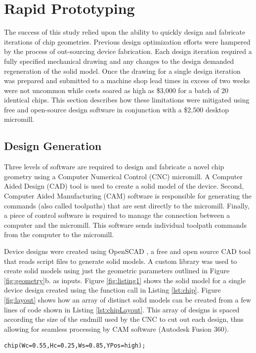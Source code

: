 \section{Rapid Prototyping}
\label{sec:rp}
The success of this study relied upon the ability to quickly design and fabricate iterations of chip geometries. Previous design optimization efforts were hampered by the process of out-sourcing device fabrication. Each design iteration required a fully specified mechanical drawing and any changes to the design demanded regeneration of the solid model. Once the drawing for a single design iteration was prepared and submitted to a machine shop lead times in excess of two weeks were not uncommon while costs soared as high as \$3,000 for a batch of 20 identical chips. This section describes how these limitations were mitigated using free and open-source design software in conjunction with a \$2,500 desktop micromill.

\subsection{Design Generation}
\label{ssec:design}
Three levels of software are required to design and fabricate a novel chip geometry using a Computer Numerical Control (CNC) micromill. A Computer Aided Design (CAD) tool is used to create a solid model of the device. Second, Computer Aided Manufacturing (CAM) software is responsible for generating the commands (also called toolpaths) that are sent directly to the micromill. Finally, a piece of control software is required to manage the connection between a computer and the micromill. This software sends individual toolpath commands from the computer to the micromill. 

Device designs were created using OpenSCAD \cite{wikiOpenScad}, a free and open source CAD tool that reads script files to generate solid models. A custom library was used to create solid models using just the geometric parameters outlined in Figure \ref{fig:geometry}b. as inputs. Figure \ref{fig:listing1} shows the solid model for a single device design created using the function call in Listing \ref{lst:chip}. Figure \ref{fig:layout} shows how an array of distinct solid models can be created from a few lines of code shown in Listing \ref{lst:chipLayout}. This array of designs is spaced according the size of the endmill used by the CNC to cut out each design, thus allowing for seamless processing by CAM software (Autodesk Fusion 360).

\begin{minipage}{0.99\linewidth}
\begin{lstlisting}[caption={The custom OpenSCAD library allows solid model creation using just a single line of code},label={lst:chip}, frame=single, language=scad]
  chip(Wc=0.55,Hc=0.25,Ws=0.85,YPos=high);
\end{lstlisting}
\end{minipage}

